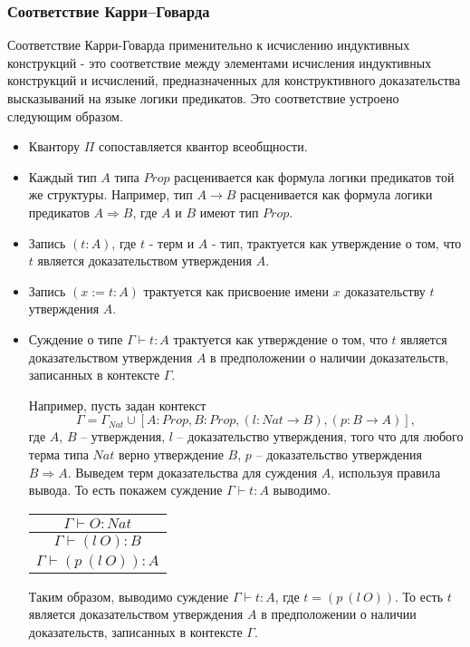 \documentclass[12pt]{article}
\begin{document}
\subsubsection{Соответствие Карри--Говарда}
Соответствие Карри-Говарда  применительно к исчислению индуктивных конструкций  - это соответствие между элементами исчисления индуктивных конструкций и исчислений, предназначенных для конструктивного доказательства высказываний на языке логики предикатов.
Это соответствие устроено следующим образом.
\begin{itemize}
    \item Квантору $\Pi$ сопоставляется квантор всеобщности.
    \item Каждый тип $A$ типа $Prop$ расценивается как формула логики предикатов той же структуры. Например, тип $A \xrightarrow{} B$ расценивается как формула логики предикатов $A \Rightarrow B$, где $A$ и $B$ имеют тип $Prop$.
    
    \item Запись $(t : A)$, где $t$ - терм и $A$ - тип, трактуется как утверждение о том, что $t$ является доказательством утверждения $A$.
    \item Запись $(x := t : A)$ трактуется как присвоение имени $x$ доказательству $t$ утверждения $A$.
    \item Суждение о типе $\Gamma \vdash t : A$ трактуется как утверждение о том, что $t$ является доказательством утверждения $A$ в предположении о наличии доказательств, записанных в контексте $\Gamma$.
    
Например, пусть задан контекст
$$\Gamma = \Gamma_{Nat} \cup [A:Prop, B:Prop, (l: Nat \xrightarrow{} B), (p:B \xrightarrow{} A)],$$ 
где $A$, $B$ -- утверждения, $l$ -- доказательство утверждения, того что для любого терма типа $Nat$ верно утверждение $B$, $p$ -- доказательство утверждения $B \Rightarrow A$. Выведем терм доказательства для суждения $A$, используя правила вывода.
То есть покажем суждение $\Gamma \vdash t: A$ выводимо.

\begin{center}
    \begin{tabular}{c}
         $\Gamma \vdash O: Nat$\\
         \hline
         $\Gamma \vdash (l\ O): B$\\
         \hline
         $\Gamma \vdash (p\ (l\ O)): A$
    \end{tabular}
\end{center}
Таким образом, выводимо суждение $\Gamma \vdash t: A$, где $t=(p\ (l\ O))$. То есть $t$ является доказательством утверждения $A$ в предположении о наличии доказательств, записанных в контексте $\Gamma$. 
\end{itemize}
\end{document}
